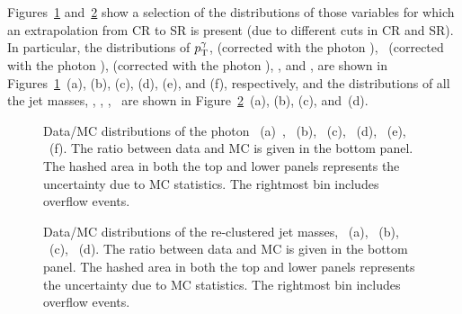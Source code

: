 		Figures~\ref{fig:ttV} and~\ref{fig:ttVMasses} show a selection of the distributions of those variables for which an extrapolation from \ac{CR} to \ac{SR} is present (due to different cuts in \ac{CR} and \ac{SR}). In particular, the distributions of $p_{\mathrm{T}}^{\gamma}$, \mttwo (corrected with the photon \pt), \mtbmin\ (corrected with the photon \pt), \mtbmax (corrected with the photon \pt), \HT, and \drbb, are shown in Figures~\ref{fig:ttV}~(a), (b), (c), (d), (e), and (f), respectively, and the distributions of all the jet masses, \mantikttwelvezero, \mantikttwelveone, \mantikteightzero, \mantikteightone\ are shown in Figure~\ref{fig:ttVMasses}~(a), (b), (c), and~(d).

		\begin{figure}[htbp]
		\centering
		\caption{Data/MC distributions of the photon \pt~(a)~\cite{stop0L}, \mttwo~(b), \mtbmin~(c), \mtbmax~(d), \HT~(e), \drbb~(f). The ratio between data and MC is given in the bottom panel. The hashed area in both the top and lower panels represents the uncertainty due to MC statistics. The rightmost bin includes overflow events.}
		\label{fig:ttV} 
		\end{figure}

		\begin{figure}[htbp]
		\centering
		\caption{Data/MC distributions of the re-clustered jet masses, \mantikttwelvezero~(a), \mantikttwelveone~(b), \mantikteightzero~(c), \mantikteightone~(d). The ratio between data and MC is given in the bottom panel. The hashed area in both the top and lower panels represents the uncertainty due to MC statistics. The rightmost bin includes overflow events.}
		\label{fig:ttVMasses} 
		\end{figure}

